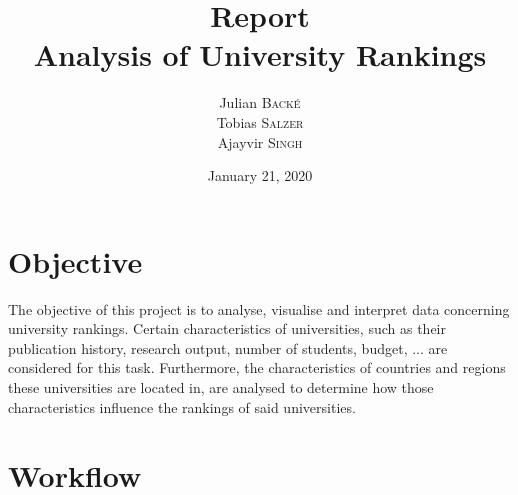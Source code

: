 \documentclass{article}
\title{Report \\ Analysis of University Rankings} %
\author{Julian \textsc{Backé} \\ Tobias \textsc{Salzer} \\ Ajayvir \textsc{Singh}} %
\date{January 21, 2020} %
\begin{document}
\maketitle %



\section{Objective}

The objective of this project is to analyse, visualise and interpret data concerning university rankings. Certain characteristics of universities, such as their publication history, research output, number of students, budget, ... are considered for this task. Furthermore, the characteristics of countries and regions these universities are located in, are analysed to determine how those characteristics influence the rankings of said universities.
\pagebreak
\section{Workflow}
\end{document}
